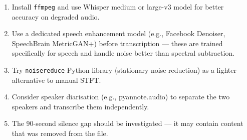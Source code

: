 \documentclass[
]{article}
\providecommand{\tightlist}{%
  \setlength{\itemsep}{0pt}\setlength{\parskip}{0pt}}
\begin{document}
\begin{enumerate}
\def\labelenumi{\arabic{enumi}.}
\tightlist
\item
  Install \texttt{ffmpeg} and use Whisper medium or large-v3 model for
  better accuracy on degraded audio.
\item
  Use a dedicated speech enhancement model (e.g., Facebook Denoiser,
  SpeechBrain MetricGAN+) before transcription --- these are trained
  specifically for speech and handle noise better than spectral
  subtraction.
\item
  Try \texttt{noisereduce} Python library (stationary noise reduction)
  as a lighter alternative to manual STFT.
\item
  Consider speaker diarisation (e.g., pyannote.audio) to separate the
  two speakers and transcribe them independently.
\item
  The 90-second silence gap should be investigated --- it may contain
  content that was removed from the file.
\end{enumerate}
\end{document}
